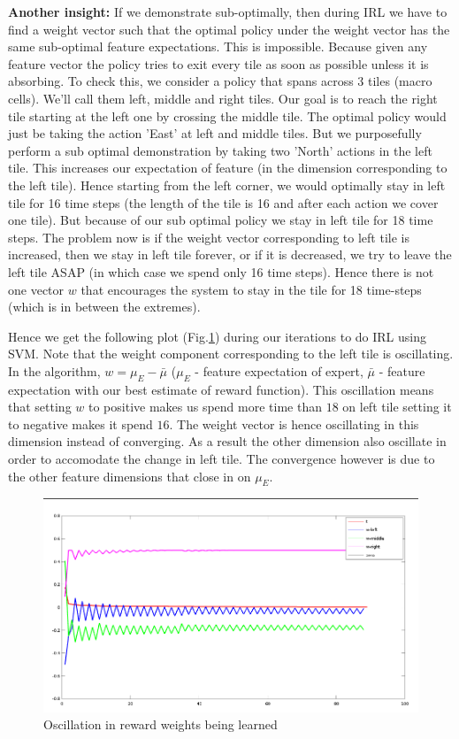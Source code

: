 \documentclass{article}[11pt]
\begin{document}
\textbf{Another insight:} If we demonstrate sub-optimally, then during IRL we have to find a weight vector such that the optimal policy under the weight vector has the same sub-optimal feature expectations. This is impossible. Because given any feature vector the policy tries to exit every tile as soon as possible unless it is absorbing. To check this, we consider a policy that spans across 3 tiles (macro cells). We'll call them left, middle and right tiles. Our goal is to reach the right tile starting at the left one by crossing the middle tile. The optimal policy would just be taking the action 'East' at left and middle tiles. But we purposefully perform a sub optimal demonstration by taking two 'North' actions in the left tile. This increases our expectation of feature (in the dimension corresponding to the left tile). Hence starting from the left corner, we would optimally stay in left tile for 16 time steps (the length of the tile is 16 and after each action we cover one tile). But because of our sub optimal policy we stay in left tile for 18 time steps. The problem now is if the weight vector corresponding to left tile is increased, then we stay in left tile forever, or if it is decreased, we try to leave the left tile ASAP (in which case we spend only 16 time steps). Hence there is not one vector $w$ that encourages the system to stay in the tile for 18 time-steps (which is in between the extremes). 

Hence we get the following plot (Fig.\ref{fig:osc}) during our iterations to do IRL using SVM. Note that the weight component corresponding to the left tile is oscillating. In the algorithm, $w = \mu_E - \bar{\mu}$ ($\mu_E$ - feature expectation of expert, $\bar{\mu}$ - feature expectation with our best estimate of reward function). This oscillation means that setting $w$ to positive makes us spend more time than $18$ on left tile setting it to negative makes it spend $16$. The weight vector is hence oscillating in this dimension instead of converging. As a result the other dimension also oscillate in order to accomodate the change in left tile. The convergence however is due to the other feature dimensions that close in on $\mu_E$.

\begin{figure}[H]
  \begin{center}
    \includegraphics[width=1.2\linewidth]{images/osc}
    \caption{Oscillation in reward weights being learned}
    \label{fig:osc}
  \end{center}
\end{figure}
\end{document}
